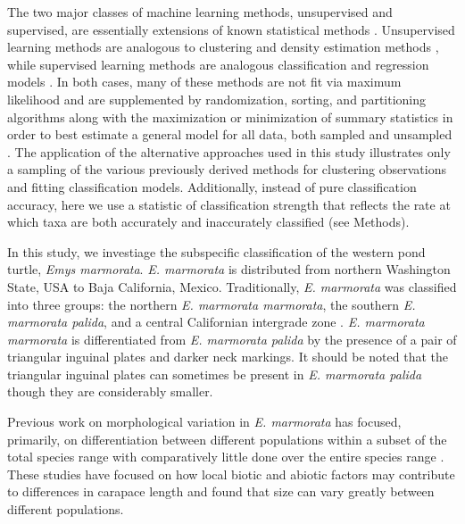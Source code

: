 \documentclass[12pt,letterpaper]{article}\usepackage{graphicx, color}
\begin{document}
The two major classes of machine learning methods, unsupervised and supervised, are essentially extensions of known statistical methods \citep{Hastie2009}. Unsupervised learning methods are analogous to clustering and density estimation methods \citep{Kaufman1990}, while supervised learning methods are analogous classification and regression models \citep{Breiman1984}. In both cases, many of these methods are not fit via maximum likelihood and are supplemented by randomization, sorting, and partitioning algorithms along with the maximization or minimization of summary statistics in order to best estimate a general model for all data, both sampled and unsampled \citep{Hastie2009}. The application of the alternative approaches used in this study illustrates only a sampling of the various previously derived methods for clustering observations and fitting classification models. 
Additionally, instead of pure classification accuracy, here we use a statistic of classification strength that reflects the rate at which taxa are both accurately and inaccurately classified (see Methods).


In this study, we investiage the subspecific classification of the western pond turtle, \textit{Emys marmorata}. \textit{E. marmorata} is distributed from northern Washington State, USA to Baja California, Mexico.
Traditionally, \textit{E. marmorata} was classified into three groups: the northern \textit{E. marmorata marmorata}, the southern \textit{E. marmorata palida}, and a central Californian intergrade zone \citep{Seeliger1945}. \textit{E. marmorata marmorata} is differentiated from \textit{E. marmorata palida} by the presence of a pair of triangular inguinal plates and darker neck markings. It should be noted that the triangular inguinal plates can sometimes be present in \textit{E. marmorata palida} though they are considerably smaller.

Previous work on morphological variation in \textit{E. marmorata} has focused, primarily, on differentiation between different populations within a subset of the total species range \citep{Lubcke2007,Germano2009,Germano2008,Bury2010} with comparatively little done over the entire species range \citep{Holland1992}. These studies have focused on how local biotic and abiotic factors may contribute to differences in carapace length \citep{Lubcke2007,Germano2009,Germano2008} and found that size can vary greatly between different populations. 
\end{document}
